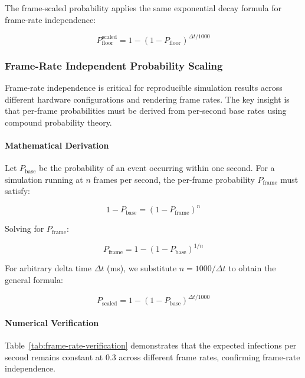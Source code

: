 The frame-scaled probability applies the same exponential decay formula for frame-rate independence:

\begin{equation}
\label{eq:floor-prob-scaled}
P_{\text{floor}}^{\text{scaled}} = 1 - (1 - P_{\text{floor}})^{\Delta t / 1000}
\end{equation}

\subsubsection{Frame-Rate Independent Probability Scaling}

Frame-rate independence is critical for reproducible simulation results across different hardware configurations and rendering frame rates. The key insight is that per-frame probabilities must be derived from per-second base rates using compound probability theory.

\paragraph{Mathematical Derivation}

Let $P_{\text{base}}$ be the probability of an event occurring within one second. For a simulation running at $n$ frames per second, the per-frame probability $P_{\text{frame}}$ must satisfy:

\begin{equation}
\label{eq:compound-prob}
1 - P_{\text{base}} = (1 - P_{\text{frame}})^n
\end{equation}

Solving for $P_{\text{frame}}$:

\begin{equation}
\label{eq:frame-prob-solution}
P_{\text{frame}} = 1 - (1 - P_{\text{base}})^{1/n}
\end{equation}

For arbitrary delta time $\Delta t$ (ms), we substitute $n = 1000 / \Delta t$ to obtain the general formula:

\begin{equation}
\label{eq:delta-prob}
P_{\text{scaled}} = 1 - (1 - P_{\text{base}})^{\Delta t / 1000}
\end{equation}

\paragraph{Numerical Verification}

Table~\ref{tab:frame-rate-verification} demonstrates that the expected infections per second remains constant at 0.3 across different frame rates, confirming frame-rate independence.

